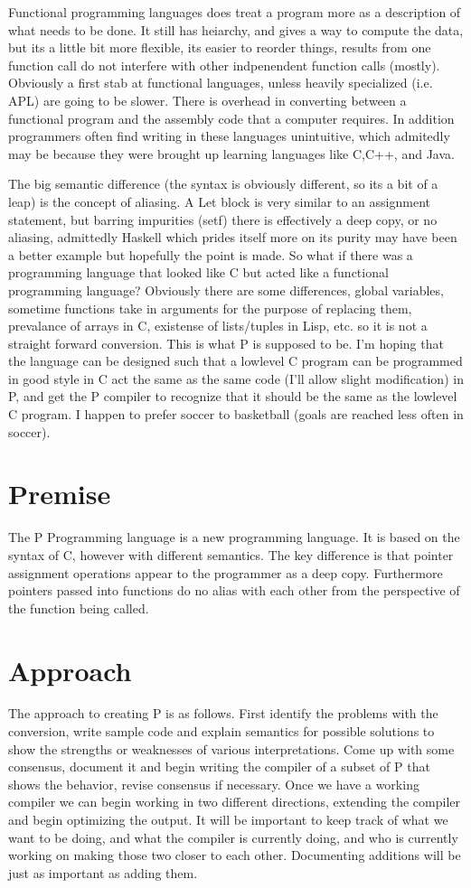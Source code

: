 Functional programming languages does treat a program more as a description of what needs to be done. It still has heiarchy, and gives a way to compute the data, but its 
a little bit more flexible, its easier to reorder things, results from one function call do not interfere with other indpenendent function calls (mostly). Obviously a 
first stab at functional languages, unless heavily specialized (i.e. APL) are going to be slower. There is overhead in converting between a functional program and the 
assembly code that a computer requires. In addition programmers often find writing in these languages unintuitive, which admitedly may be because they were brought up 
learning languages like C,C++, and Java.

The big semantic difference (the syntax is obviously different, so its a bit of a leap) is the concept of aliasing. A Let block is very similar to an assignment 
statement, but barring impurities (setf) there is effectively a deep copy, or no aliasing, admittedly Haskell which prides itself more on its purity may have been a 
better example but hopefully the point is made. So what if there was a programming language that looked like C but acted like a functional programming language? Obviously 
there are some differences, global variables, sometime functions take in arguments for the purpose of replacing them, prevalance of arrays in C, existense of lists/tuples 
in Lisp, etc. so it is not a straight forward conversion. This is what P is supposed to be. I'm hoping that the language can be designed such that a lowlevel C program 
can be programmed in good style in C act the same as the same code (I'll allow slight modification) in P, and get the P compiler to recognize that it should be the same 
as the lowlevel C program. I happen to prefer soccer to basketball (goals are reached less often in soccer).
\section{Premise}
The P Programming language is a new programming language. It is based on the syntax of C, however with different semantics. The key difference is that pointer assignment 
operations appear to the programmer as a deep copy. Furthermore pointers passed into functions do no alias with each other from the perspective of the function being 
called.
\section{Approach}
The approach to creating P is as follows. First identify the problems with the conversion, write sample code and explain semantics for possible solutions to show the 
strengths or weaknesses of various interpretations. Come up with some consensus, document it and begin writing the compiler of a subset of P that shows the behavior, 
revise consensus if necessary. Once we have a working compiler we can begin working in two different directions, extending the compiler and begin optimizing the output. 
It will be important to keep track of what we want to be doing, and what the compiler is currently doing, and who is currently working on making those two closer to each 
other. Documenting additions will be just as important as adding them.

